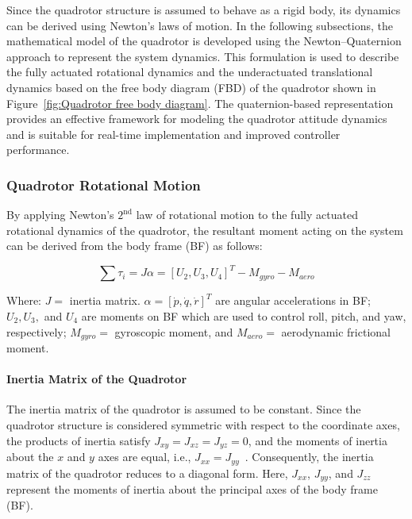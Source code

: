 Since the quadrotor structure is assumed to behave as a rigid body, its dynamics can be derived using Newton’s laws of motion. In the following subsections, the mathematical model of the quadrotor is developed using the Newton--Quaternion approach to represent the system dynamics. This formulation is used to describe the fully actuated rotational dynamics and the underactuated translational dynamics based on the free body diagram (FBD) of the quadrotor shown in Figure~\ref{fig:Quadrotor free body diagram}. The quaternion-based representation provides an effective framework for modeling the quadrotor attitude dynamics and is suitable for real-time implementation and improved controller performance.



\subsubsection{Quadrotor Rotational Motion}

By applying Newton's $2^{\text{nd}}$ law of rotational motion to the fully actuated rotational dynamics of the quadrotor, the resultant moment acting on the system can be derived from the body frame (BF) as follows:

\begin{equation}
\sum \tau_i = J \alpha = [U_2, U_3, U_4]^T - M_{gyro} - M_{aero}
\label{3.9}
\end{equation}

Where: $J =$ inertia matrix. 
$\alpha = [\dot{p}, \dot{q}, \dot{r}]^T$ are angular accelerations in BF; 
$U_2, U_3,$ and $U_4$ are moments on BF which are used to control roll, pitch, and yaw, respectively; 
$M_{gyro} =$ gyroscopic moment, and 
$M_{aero} =$ aerodynamic frictional moment.

\paragraph{Inertia Matrix of the Quadrotor}

The inertia matrix of the quadrotor is assumed to be constant. Since the quadrotor structure is considered symmetric with respect to the coordinate axes, the products of inertia satisfy $J_{xy}=J_{xz}=J_{yz}=0$, and the moments of inertia about the $x$ and $y$ axes are equal, i.e., $J_{xx}=J_{yy}$~\cite{beard2008quadrotor}. Consequently, the inertia matrix of the quadrotor reduces to a diagonal form. Here, $J_{xx}$, $J_{yy}$, and $J_{zz}$ represent the moments of inertia about the principal axes of the body frame (BF).


